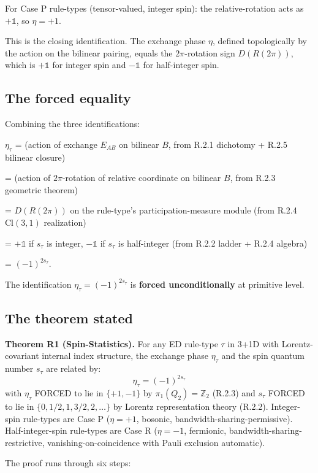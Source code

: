\documentclass[11pt,a4paper]{article}
\begin{document}
For Case P rule-types (tensor-valued, integer spin): the relative-rotation acts as $+\mathbb{1}$, so $\eta = +1$.

This is the closing identification. The exchange phase $\eta$, defined topologically by the action on the bilinear pairing, equals the $2\pi$-rotation sign $D(R(2\pi))$, which is $+\mathbb{1}$ for integer spin and $-\mathbb{1}$ for half-integer spin.

\subsection{The forced equality}

Combining the three identifications:

$\eta_\tau$ = (action of exchange $E_{AB}$ on bilinear $B$, from R.2.1 dichotomy + R.2.5 bilinear closure)

= (action of $2\pi$-rotation of relative coordinate on bilinear $B$, from R.2.3 geometric theorem)

= $D(R(2\pi))$ on the rule-type's participation-measure module (from R.2.4 $\mathrm{Cl}(3,1)$ realization)

= $+\mathbb{1}$ if $s_\tau$ is integer, $-\mathbb{1}$ if $s_\tau$ is half-integer (from R.2.2 ladder + R.2.4 algebra)

= $(-1)^{2s_\tau}$.

The identification $\eta_\tau = (-1)^{2s_\tau}$ is \textbf{forced unconditionally} at primitive level.

\subsection{The theorem stated}

\textbf{Theorem R1 (Spin-Statistics).} For any ED rule-type $\tau$ in 3+1D with Lorentz-covariant internal index structure, the exchange phase $\eta_\tau$ and the spin quantum number $s_\tau$ are related by:
\[
\eta_\tau = (-1)^{2s_\tau}
\]
with $\eta_\tau$ FORCED to lie in $\{+1, -1\}$ by $\pi_1(Q_2) = \mathbb{Z}_2$ (R.2.3) and $s_\tau$ FORCED to lie in $\{0, 1/2, 1, 3/2, 2, \ldots\}$ by Lorentz representation theory (R.2.2). Integer-spin rule-types are Case P ($\eta = +1$, bosonic, bandwidth-sharing-permissive). Half-integer-spin rule-types are Case R ($\eta = -1$, fermionic, bandwidth-sharing-restrictive, vanishing-on-coincidence with Pauli exclusion automatic).

The proof runs through six steps:
\end{document}
